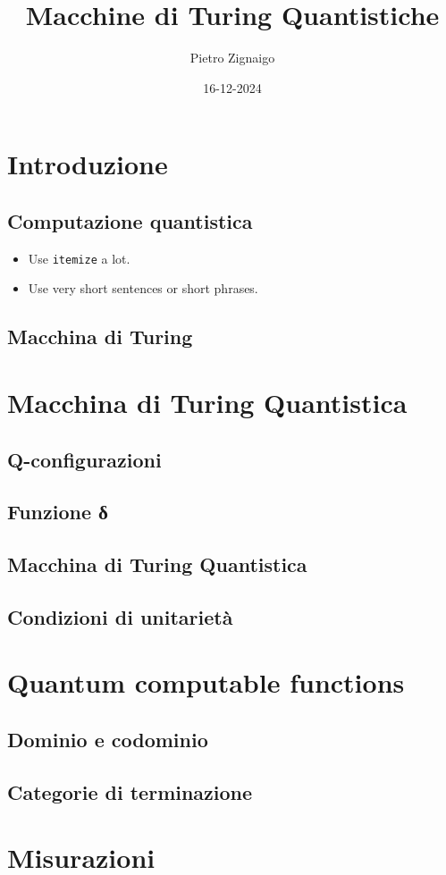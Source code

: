 \documentclass{beamer}
\title
{Macchine di Turing Quantistiche}
\author
{Pietro Zignaigo}
\institute
{Università di Genova}
\date
{16-12-2024}
\begin{document}
\begin{frame}
	\titlepage
\end{frame}

\begin{frame}
	\tableofcontents
\end{frame}

\section{Introduzione}

\subsection{Computazione quantistica}

\begin{frame}{\subsecname}
	\begin{itemize}
	\item Use \texttt{itemize} a lot.
	\item Use very short sentences or short phrases.
	\end{itemize}
\end{frame}

\subsection{Macchina di Turing}

\section{Macchina di Turing Quantistica}

\subsection{Q-configurazioni}

\subsection{Funzione δ}

\subsection{Macchina di Turing Quantistica}

\subsection{Condizioni di unitarietà}

\section{Quantum computable functions}

\subsection{Dominio e codominio}

\subsection{Categorie di terminazione}

\section{Misurazioni}
\end{document}
